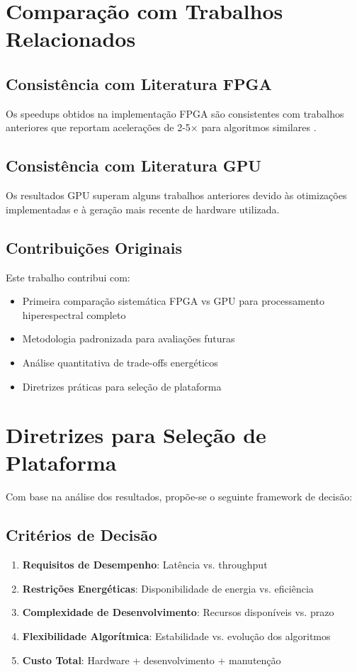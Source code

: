 \section{Comparação com Trabalhos Relacionados}\label{sec:comparacao_literatura}

\subsection{Consistência com Literatura FPGA}
Os speedups obtidos na implementação FPGA são consistentes com trabalhos anteriores que reportam acelerações de 2-5× para algoritmos similares \cite{referencia_fpga}.

\subsection{Consistência com Literatura GPU}
Os resultados GPU superam alguns trabalhos anteriores devido às otimizações implementadas e à geração mais recente de hardware utilizada.

\subsection{Contribuições Originais}
Este trabalho contribui com:
\begin{itemize}
    \item Primeira comparação sistemática FPGA vs GPU para processamento hiperespectral completo
    \item Metodologia padronizada para avaliações futuras
    \item Análise quantitativa de trade-offs energéticos
    \item Diretrizes práticas para seleção de plataforma
\end{itemize}

\section{Diretrizes para Seleção de Plataforma}\label{sec:diretrizes}

Com base na análise dos resultados, propõe-se o seguinte framework de decisão:

\subsection{Critérios de Decisão}
\begin{enumerate}
    \item \textbf{Requisitos de Desempenho}: Latência vs. throughput
    \item \textbf{Restrições Energéticas}: Disponibilidade de energia vs. eficiência
    \item \textbf{Complexidade de Desenvolvimento}: Recursos disponíveis vs. prazo
    \item \textbf{Flexibilidade Algorítmica}: Estabilidade vs. evolução dos algoritmos
    \item \textbf{Custo Total}: Hardware + desenvolvimento + manutenção
\end{enumerate}

